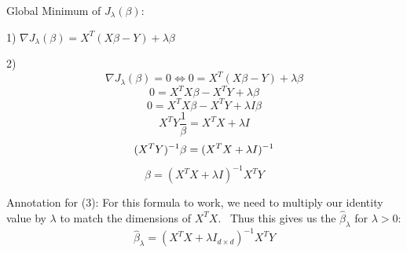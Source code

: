 
\begin{answer}

Global Minimum of $J_\lambda(\beta)$: \

1) $\nabla J_\lambda(\beta) = X^T(X\beta - Y) + \lambda\beta$

2)
\setcounter{equation}{0}
\begin{equation}
    \nabla J_\lambda(\beta) = 0 \Leftrightarrow 0 = X^T(X\beta - Y) + \lambda\beta
\end{equation}
\begin{equation}
    0 = X^T X \beta - X^T Y + \lambda\beta
\end{equation}
\begin{equation}
    0 = X^T X \beta - X^T Y + \lambda I \beta
\end{equation}
\begin{equation}
    X^T Y \frac{1}{\beta} = X^T X + \lambda I
\end{equation}
\begin{equation}
    (X^T Y)^{-1} \beta = (X^T X + \lambda I)^{-1} \\
\end{equation}
\begin{equation}
    \beta = (X^T X + \lambda I)^{-1} X^T Y
\end{equation}


Annotation for (3): For this formula to work, we need to multiply our identity value by $\lambda$ to match the dimensions of $X^T X$. \ Thus this gives us the $\hat{\beta}_{\lambda}$ for $\lambda > 0$:
\begin{equation}
\hat{\beta}_{\lambda} = (X^T X + \lambda I_{d \times d})^{-1} X^T Y
\end{equation}
\end{answer}
